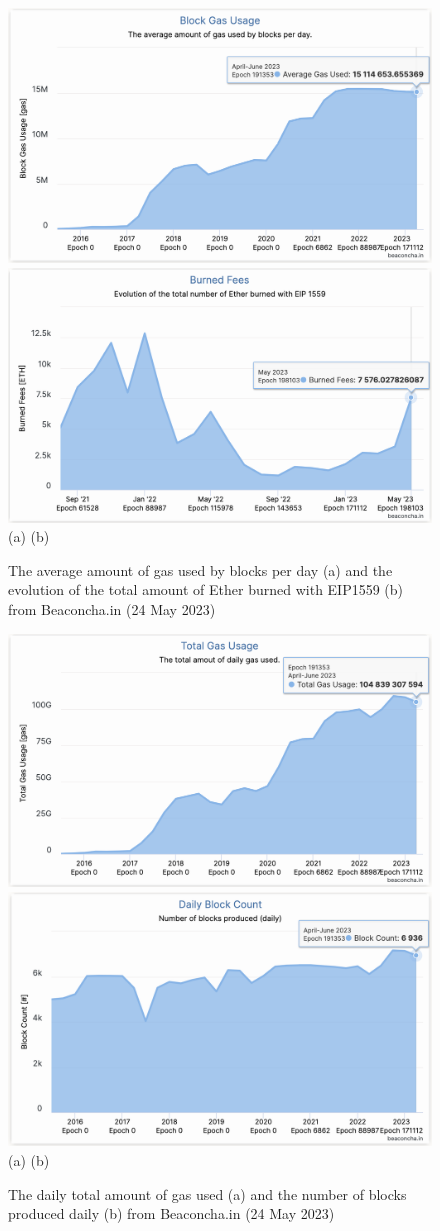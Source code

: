\documentclass[UTF8]{article}
\begin{document}
{\begin{figure}[htbp]
\begin{center}
\includegraphics[width=0.48\linewidth]{images/bchart19}
\includegraphics[width=0.48\linewidth]{images/bchart20} \\
(a)\hspace{160pt}        (b)\\
\caption{The average amount of gas used by blocks per day (a) and the evolution of the total amount of Ether burned with EIP1559 (b) from Beaconcha.in (24 May 2023)}
\label{fig:chart19}
\end{center}
\end{figure}

\begin{figure}[htbp]
\begin{center}
\includegraphics[width=0.48\linewidth]{images/bchart21}
\includegraphics[width=0.48\linewidth]{images/bchart22} \\
(a)\hspace{160pt}        (b)\\
\caption{The daily total amount of gas used  (a) and the number of blocks produced daily (b) from Beaconcha.in (24 May 2023)}
\label{fig:chart21}
\end{center}
\end{figure}

}
\end{document}
